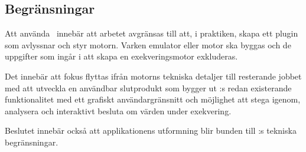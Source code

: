 \subsection{Begränsningar}

Att använda \stoe\ innebär att arbetet avgränsas till att, i praktiken, skapa
ett plugin som avlyssnar och styr motorn. Varken emulator eller motor ska
byggas och de uppgifter som ingår i att skapa en exekveringsmotor exkluderas.

Det innebär att fokus flyttas ifrån motorns tekniska detaljer till resterande
jobbet med att utveckla en användbar slutprodukt som bygger ut \stoe:s redan
existerande funktionalitet med ett grafiskt användargränsnitt och möjlighet att
stega igenom, analysera och interaktivt besluta om värden under exekvering.

Beslutet innebär också att applikationens utformning blir bunden till \stoe:s
tekniska begränsningar.
